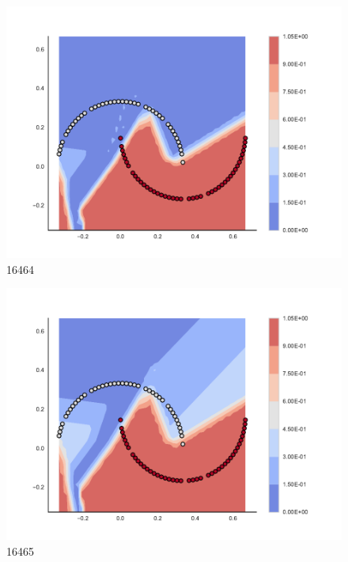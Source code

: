 \begin{subfigure}[b]{0.09\textwidth}
    \includegraphics[clip, trim=2.35cm 1.75cm 4.5cm 0cm,width=\textwidth]{img/convergence/16464.pdf}
    \caption{16464}
    \label{fig:convergence_16464}
\end{subfigure}
%
\begin{subfigure}[b]{0.09\textwidth}
    \includegraphics[clip, trim=2.35cm 1.75cm 4.5cm 0cm,width=\textwidth]{img/convergence/16465.pdf}
    \caption{16465}
    \label{fig:convergence_16465}
\end{subfigure}
%
